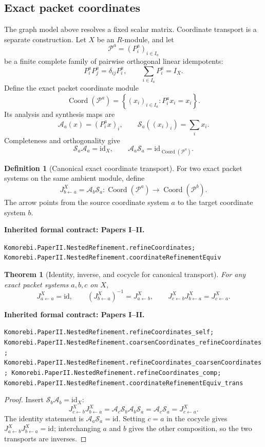 \documentclass[11pt,a4paper]{article}
\newtheorem{theorem}{Theorem}[section]
\theoremstyle{plain}
\theoremstyle{definition}
\newtheorem{definition}[definition]{Definition}
\theoremstyle{remark}
\newcommand{\cA}{\mathcal A}
\newcommand{\cP}{\mathcal P}
\newcommand{\cS}{\mathcal S}
\newcommand{\id}{\mathrm{id}}
\newcommand{\Coord}{\operatorname{Coord}}
\newcommand{\leanname}[1]{\nolinkurl{#1}}
\newcommand{\statusleanprior}[1]{\par\smallskip\noindent\begin{minipage}{\linewidth}{\color{leanblue}\textbf{Inherited formal contract: Papers I--II.}}\par\begingroup\small\raggedright\leanname{#1}\par\endgroup\end{minipage}\par\smallskip}
\begin{document}
\subsection{Exact packet coordinates}

The graph model above resolves a fixed scalar matrix.  Coordinate transport
is a separate construction.  Let $X$ be an $R$-module, and let
\[
\cP^a=(P^a_i)_{i\in I_a}
\]
be a finite complete family of pairwise orthogonal linear idempotents:
\[
P^a_iP^a_j=\delta_{ij}P^a_i,
\qquad
\sum_{i\in I_a}P^a_i=I_X.
\]
Define the exact packet coordinate module
\[
\Coord(\cP^a)
=
\left\{(x_i)_{i\in I_a}:P^a_ix_i=x_i\right\}.
\]
Its analysis and synthesis maps are
\[
\cA_a(x)=(P^a_ix)_i,
\qquad
\cS_a((x_i)_i)=\sum_ix_i.
\]
Completeness and orthogonality give
\[
\cS_a\cA_a=\id_X,
\qquad
\cA_a\cS_a=\id_{\Coord(\cP^a)}.
\]

\begin{definition}[Canonical exact coordinate transport]
\label{def:canonical-J}
For two exact packet systems on the same ambient module, define
\[
  J^X_{b\leftarrow a}
  =
  \cA_b\cS_a:
  \Coord(\cP^a)\longrightarrow\Coord(\cP^b).
\]
The arrow points from the source coordinate system $a$ to the target
coordinate system $b$.
\end{definition}
\statusleanprior{Komorebi.PaperII.NestedRefinement.refineCoordinates; Komorebi.PaperII.NestedRefinement.coordinateRefinementEquiv}

\begin{theorem}[Identity, inverse, and cocycle for canonical transport]
\label{thm:J-cocycle}
For any exact packet systems $a,b,c$ on $X$,
\[
J^X_{a\leftarrow a}=\id,
\qquad
\left(J^X_{b\leftarrow a}\right)^{-1}=J^X_{a\leftarrow b},
\qquad
J^X_{c\leftarrow b}J^X_{b\leftarrow a}=J^X_{c\leftarrow a}.
\]
\end{theorem}
\statusleanprior{Komorebi.PaperII.NestedRefinement.refineCoordinates_self; Komorebi.PaperII.NestedRefinement.coarsenCoordinates_refineCoordinates; Komorebi.PaperII.NestedRefinement.refineCoordinates_coarsenCoordinates; Komorebi.PaperII.NestedRefinement.refineCoordinates_comp; Komorebi.PaperII.NestedRefinement.coordinateRefinementEquiv_trans}

\begin{proof}
Insert $\cS_b\cA_b=\id_X$:
\[
J^X_{c\leftarrow b}J^X_{b\leftarrow a}
=\cA_c\cS_b\cA_b\cS_a
=\cA_c\cS_a
=J^X_{c\leftarrow a}.
\]
The identity statement is $\cA_a\cS_a=\id$.  Setting $c=a$ in the cocycle
gives $J^X_{a\leftarrow b}J^X_{b\leftarrow a}=\id$; interchanging $a$ and $b$
gives the other composition, so the two transports are inverses.
\end{proof}
\end{document}
